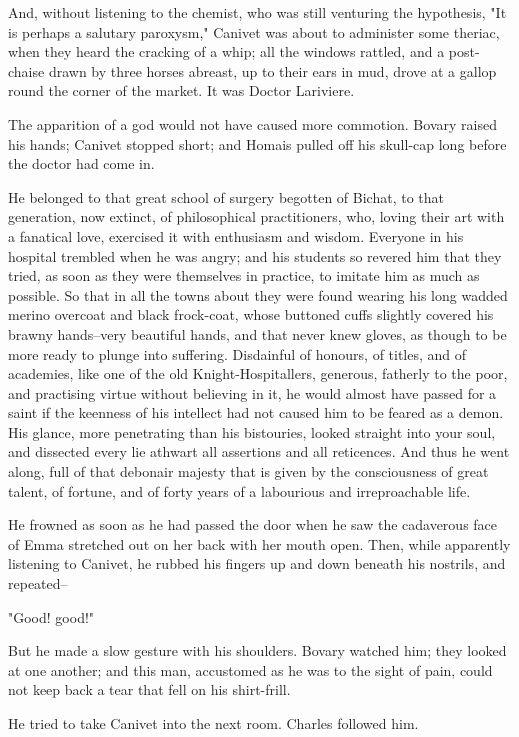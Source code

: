 \documentclass[11pt,twocolumn]{ltugboat}
\begin{document}
And, without listening to the chemist, who was still venturing the
hypothesis, "It is perhaps a salutary paroxysm," Canivet was about to
administer some theriac, when they heard the cracking of a whip; all the
windows rattled, and a post-chaise drawn by three horses abreast, up to
their ears in mud, drove at a gallop round the corner of the market. It
was Doctor Lariviere.

The apparition of a god would not have caused more commotion. Bovary
raised his hands; Canivet stopped short; and Homais pulled off his
skull-cap long before the doctor had come in.

He belonged to that great school of surgery begotten of Bichat, to that
generation, now extinct, of philosophical practitioners, who, loving
their art with a fanatical love, exercised it with enthusiasm and
wisdom. Everyone in his hospital trembled when he was angry; and his
students so revered him that they tried, as soon as they were themselves
in practice, to imitate him as much as possible. So that in all the
towns about they were found wearing his long wadded merino overcoat
and black frock-coat, whose buttoned cuffs slightly covered his brawny
hands--very beautiful hands, and that never knew gloves, as though to be
more ready to plunge into suffering. Disdainful of honours, of titles,
and of academies, like one of the old Knight-Hospitallers, generous,
fatherly to the poor, and practising virtue without believing in it, he
would almost have passed for a saint if the keenness of his intellect
had not caused him to be feared as a demon. His glance, more penetrating
than his bistouries, looked straight into your soul, and dissected every
lie athwart all assertions and all reticences. And thus he went along,
full of that debonair majesty that is given by the consciousness
of great talent, of fortune, and of forty years of a labourious and
irreproachable life.

He frowned as soon as he had passed the door when he saw the cadaverous
face of Emma stretched out on her back with her mouth open. Then, while
apparently listening to Canivet, he rubbed his fingers up and down
beneath his nostrils, and repeated--

"Good! good!"

But he made a slow gesture with his shoulders. Bovary watched him; they
looked at one another; and this man, accustomed as he was to the sight
of pain, could not keep back a tear that fell on his shirt-frill.

He tried to take Canivet into the next room. Charles followed him.
\end{document}
